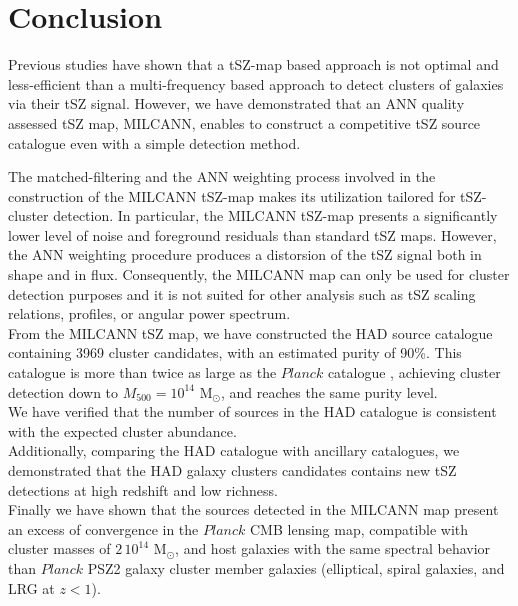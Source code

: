\documentclass[traditabstract,a4,twocolumn]{aa}
\begin{document}
\section{Conclusion}

Previous studies have shown that a tSZ-map based approach is not optimal
  and less-efficient than a multi-frequency based approach
  \citep{mel12} to detect clusters of galaxies via their tSZ signal.  
  However, we have demonstrated that an ANN quality assessed tSZ map, MILCANN, enables
  to construct a competitive tSZ source catalogue even with a simple
  detection method. 
  
  The matched-filtering and the ANN weighting process involved in the construction of the MILCANN tSZ-map makes its utilization tailored for tSZ-cluster detection. In
  particular, the MILCANN tSZ-map presents a significantly lower level
  of noise and foreground residuals than standard tSZ maps.  However,
  the ANN weighting procedure produces a distorsion of the tSZ signal both in
  shape and in flux. Consequently, the MILCANN map can only be used for
  cluster detection purposes and it is not suited for other
  analysis such as tSZ scaling relations, profiles, or angular power
  spectrum.\\ From the MILCANN tSZ map, we have constructed the HAD
  source catalogue containing 3969 cluster candidates, with an
  estimated purity of 90\%. This catalogue is more than twice as large as the $Planck$ catalogue \citep{PSZ2}, achieving cluster detection down to
  $M_{500} = 10^{14}$ M$_\odot$, and reaches the same purity level.\\ We have verified that the number of sources in the HAD
    catalogue is consistent with the expected cluster abundance.
  \\ Additionally, comparing the HAD catalogue with ancillary catalogues, we
  demonstrated that the HAD galaxy clusters candidates contains new tSZ detections at high redshift and low richness. \\ 
  Finally we have shown that the sources detected in the
  MILCANN map present an excess of convergence in the {\it $Planck$} CMB lensing map,
  compatible with cluster masses of $2\,10^{14}$ M$_\odot$,
  and host galaxies with the same spectral behavior than $Planck$ PSZ2
  galaxy cluster member galaxies (elliptical, spiral galaxies, and LRG
  at $z < 1$).\\
\end{document}
